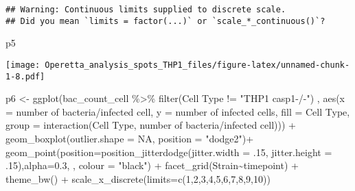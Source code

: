 \documentclass[
]{article}
\newenvironment{Shaded}{\begin{snugshade}}{\end{snugshade}}
\newcommand{\AttributeTok}[1]{\textcolor[rgb]{0.77,0.63,0.00}{#1}}
\newcommand{\ConstantTok}[1]{\textcolor[rgb]{0.00,0.00,0.00}{#1}}
\newcommand{\DecValTok}[1]{\textcolor[rgb]{0.00,0.00,0.81}{#1}}
\newcommand{\FloatTok}[1]{\textcolor[rgb]{0.00,0.00,0.81}{#1}}
\newcommand{\FunctionTok}[1]{\textcolor[rgb]{0.00,0.00,0.00}{#1}}
\newcommand{\NormalTok}[1]{#1}
\newcommand{\OtherTok}[1]{\textcolor[rgb]{0.56,0.35,0.01}{#1}}
\newcommand{\SpecialCharTok}[1]{\textcolor[rgb]{0.00,0.00,0.00}{#1}}
\newcommand{\StringTok}[1]{\textcolor[rgb]{0.31,0.60,0.02}{#1}}
\begin{document}
\begin{verbatim}
## Warning: Continuous limits supplied to discrete scale.
## Did you mean `limits = factor(...)` or `scale_*_continuous()`?
\end{verbatim}

\begin{Shaded}
\begin{Highlighting}[]
\NormalTok{p5}
\end{Highlighting}
\end{Shaded}

\texttt{[image: Operetta\_analysis\_spots\_THP1\_files/figure-latex/unnamed-chunk-1-8.pdf]}

\begin{Shaded}
\begin{Highlighting}[]
\NormalTok{p6 }\OtherTok{\textless{}{-}} \FunctionTok{ggplot}\NormalTok{(bac\_count\_cell }\SpecialCharTok{\%\textgreater{}\%}
               \FunctionTok{filter}\NormalTok{(}\StringTok{\textasciigrave{}}\AttributeTok{Cell Type}\StringTok{\textasciigrave{}} \SpecialCharTok{!=} \StringTok{"THP1 casp1{-}/{-}"}\NormalTok{)}
\NormalTok{             , }\FunctionTok{aes}\NormalTok{(}\AttributeTok{x =} \StringTok{\textasciigrave{}}\AttributeTok{number of bacteria/infected cell}\StringTok{\textasciigrave{}}\NormalTok{, }\AttributeTok{y =} \StringTok{\textasciigrave{}}\AttributeTok{number of infected cells}\StringTok{\textasciigrave{}}\NormalTok{, }\AttributeTok{fill =} \StringTok{\textasciigrave{}}\AttributeTok{Cell Type}\StringTok{\textasciigrave{}}\NormalTok{,}
                   \AttributeTok{group =}  \FunctionTok{interaction}\NormalTok{(}\StringTok{\textasciigrave{}}\AttributeTok{Cell Type}\StringTok{\textasciigrave{}}\NormalTok{, }\StringTok{\textasciigrave{}}\AttributeTok{number of bacteria/infected cell}\StringTok{\textasciigrave{}}\NormalTok{))) }\SpecialCharTok{+}
  \FunctionTok{geom\_boxplot}\NormalTok{(}\AttributeTok{outlier.shape =} \ConstantTok{NA}\NormalTok{, }\AttributeTok{position =} \StringTok{"dodge2"}\NormalTok{)}\SpecialCharTok{+}
  \FunctionTok{geom\_point}\NormalTok{(}\AttributeTok{position=}\FunctionTok{position\_jitterdodge}\NormalTok{(}\AttributeTok{jitter.width =}\NormalTok{ .}\DecValTok{15}\NormalTok{, }\AttributeTok{jitter.height =}\NormalTok{ .}\DecValTok{15}\NormalTok{),}\AttributeTok{alpha=}\FloatTok{0.3}\NormalTok{, , }\AttributeTok{colour =} \StringTok{"black"}\NormalTok{) }\SpecialCharTok{+}
  \FunctionTok{facet\_grid}\NormalTok{(Strain}\SpecialCharTok{\textasciitilde{}}\NormalTok{timepoint) }\SpecialCharTok{+}
  \FunctionTok{theme\_bw}\NormalTok{() }\SpecialCharTok{+}
  \FunctionTok{scale\_x\_discrete}\NormalTok{(}\AttributeTok{limits=}\FunctionTok{c}\NormalTok{(}\DecValTok{1}\NormalTok{,}\DecValTok{2}\NormalTok{,}\DecValTok{3}\NormalTok{,}\DecValTok{4}\NormalTok{,}\DecValTok{5}\NormalTok{,}\DecValTok{6}\NormalTok{,}\DecValTok{7}\NormalTok{,}\DecValTok{8}\NormalTok{,}\DecValTok{9}\NormalTok{,}\DecValTok{10}\NormalTok{))}
\end{Highlighting}
\end{Shaded}
\end{document}

